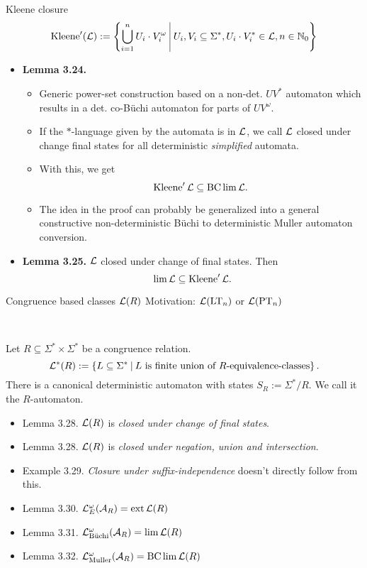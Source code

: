 \documentclass[
	notheorems,noamsthm]{beamer}
\begin{document}
\begin{frame}[<+->]{Kleene closure}
\[ \Kleene'(\Lang) := \Set{ \bigcup_{i=1}^n U_i \cdot V_i^\omega}{U_i, V_i \subseteq \Sigma^*, U_i \cdot V_i^* \in \Lang, n \in \N_0} \]

\begin{itemize}
\item \textbf{Lemma 3.24.}
\begin{itemize}
\item Generic power-set construction based on a non-det. $U V^*$ automaton which results in a det. co-Büchi automaton for parts of $U V^\omega$.
\item If the $*$-language given by the automata is in $\mathcal{L}$, we call $\mathcal{L}$ closed under change final states for all deterministic \emph{simplified} automata.
\item With this, we get
\[ \operatorname{Kleene}' \mathcal{L} \subseteq \operatorname{BC} \lim \mathcal{L} . \]
\item The idea in the proof can probably be generalized into a general constructive non-deterministic Büchi to deterministic Muller automaton conversion.
\end{itemize}

\item \textbf{Lemma 3.25.} $\mathcal{L}$ closed under change of final states. Then
\[ \lim \mathcal{L} \subseteq \operatorname{Kleene}' \mathcal{L} . \]
\end{itemize}
\end{frame}

\begin{frame}[<+->]{Congruence based classes $\mathcal{L}(R)$}
Motivation: $\mathcal{L}(\textup{\textrm{LT}}_n)$ or $\mathcal{L}(\textup{\textrm{PT}}_n)$

\

Let $R\subseteq\Sigma^* \times \Sigma^*$ be a congruence relation.
\[ \Lang^*(R) := \Set{L \subseteq \Sigma^*}{L \text{ is finite union of $R$-equivalence-classes}} . \]
There is a canonical deterministic automaton with states $S_R := \Sigma^*/R$. We call it the $R$-automaton.

\begin{itemize}
\item Lemma 3.28. $\mathcal{L}(R)$ is \emph{closed under change of final states}.
\item Lemma 3.28. $\mathcal{L}(R)$ is \emph{closed under negation, union and intersection}.
\item Example 3.29. \emph{Closure under suffix-independence} doesn't directly follow from this.
%
\item Lemma 3.30. $\mathcal{L}^\omega_E(\mathcal{A}_R) = \operatorname{ext} \mathcal{L}(R)$
\item Lemma 3.31. $\mathcal{L}^\omega_{\text{Büchi}}(\mathcal{A}_R) = \lim \mathcal{L}(R)$
\item Lemma 3.32. $\mathcal{L}^\omega_{\text{Muller}}(\mathcal{A}_R) = \operatorname{BC} \lim \mathcal{L}(R)$
\end{itemize}
\end{frame}
\end{document}
